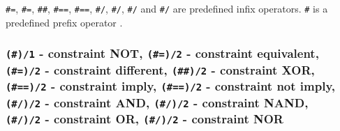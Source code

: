 \texttt{\#{\lt}={\gt}}, \texttt{\#{\bs}{\lt}={\gt}}, \texttt{\#\#},
\texttt{\#=={\gt}}, \texttt{\#{\bs}=={\gt}}, \texttt{\#/{\bs}},
\texttt{\#{\bs}/{\bs}}, \texttt{\#{\bs}/} and \texttt{\#{\bs}{\bs}/} are
predefined infix operators. \texttt{\#{\bs}} is a predefined prefix operator
.

\begin{PlErrors}




\end{PlErrors}

\subsubsection{\texttt{(\#{\bs})/1} - constraint NOT,
               \texttt{(\#{\lt}={\gt})/2} - constraint equivalent, \\
               \texttt{(\#{\bs}{\lt}={\gt})/2} - constraint different,
               \texttt{(\#\#)/2} - constraint XOR, \\
               \texttt{(\#=={\gt})/2} - constraint imply,
               \texttt{(\#{\bs}=={\gt})/2} - constraint not imply, \\
               \texttt{(\#/{\bs})/2} - constraint AND,
               \texttt{(\#{\bs}/{\bs})/2} - constraint NAND, \\
               \texttt{(\#{\bs}/)/2} - constraint OR,
               \texttt{(\#{\bs}{\bs}/)/2} - constraint NOR}

